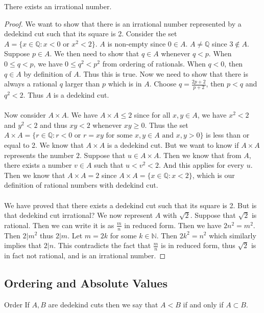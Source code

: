 \documentclass[a4paper]{article}
\begin{document}
\begin{thm}{}{} There exists an irrational number. \tcbline
\begin{proof} We want to show that there is an irrational number represented by a dedekind cut such that its square is 2. Consider the set $A=\{x\in\mathbb{Q}:x<0\text{ or }x^2<2\}$. $A$ is non-empty since $0\in A$. $A\neq\mathbb{Q}$ since $3\notin A$. Suppose $p\in A$. We then need to show that $q\in A$ whenever $q<p$. When $0\leq q<p$, we have $0\leq q^2<p^2$ from ordering of rationals. When $q<0$, then $q\in A$ by definition of $A$. Thus this is true. Now we need to show that there is always a rational $q$ larger than $p$ which is in $A$. Choose $q=\frac{2p+2}{p+2}$, then $p<q$ and $q^2<2$. Thus $A$ is a dedekind cut. \\~\\
Now consider $A\times A$. We have $A\times A\leq 2$ since for all $x,y\in A$, we have $x^2<2$ and $y^2<2$ and thus $xy<2$ whenever $xy\geq 0$. Thus the set $A\times A=\{r\in\mathbb{Q}:r<0\text{ or }r=xy\text{ for some }x,y\in A\text{ and }x,y>0\}$ is less than or equal to 2. We know that $A\times A$ is a dedekind cut. But we want to know if $A\times A$ represents the number $2$. Suppose that $u\in A\times A$. Then we know that from $A$, there exists a number $v\in A$ such that $u<v^2<2$. And this applies for every $u$. Then we know that $A\times A=2$ since $A\times A=\{x\in\mathbb{Q}:x<2\}$, which is our definition of rational numbers with dedekind cut. \\~\\
We have proved that there exists a dedekind cut such that its square is 2. But is that dedekind cut irrational? We now represent $A$ with $\sqrt2$. Suppose that $\sqrt2$ is rational. Then we can write it is as $\frac{m}{n}$ in reduced form. Then we have $2n^2=m^2$. Then $2|m^2$ thus $2|m$. Let $m=2k$ for some $k\in\mathbb{N}$. Then $2k^2=n^2$ which similarly implies that $2|n$. This contradicts the fact that $\frac{m}{n}$ is in reduced form, thus $\sqrt{2}$ is in fact not rational, and is an irrational number. 
\end{proof}
\end{thm}

\subsection{Ordering and Absolute Values}
\begin{defn}{Order}{} If $A,B$ are dedekind cuts then we say that $A<B$ if and only if $A\subset B$. 
\end{defn}
\end{document}

